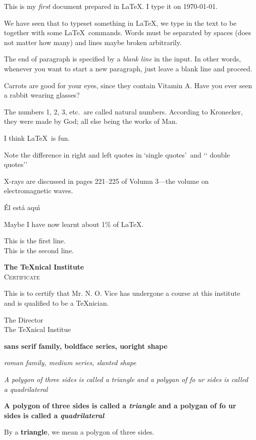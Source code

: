 \documentclass{article}
\begin{document}
This is my \emph{first} document prepared in \LaTeX. I type it on \today.

We have seen that to typeset something in \LaTeX, we type in the text to be
together with some \LaTeX\ commands.
Words must be separated by spaces (does not matter how many)
and lines maybe broken arbitrarily.

\noindent The end of paragraph is specified by a \emph{blank line}
in the input. In other words, whenever you want to start a new
paragraph, just leave a blank line and proceed.

Carrots are good for your eyes, since they contain Vitamin A\@. Have
you ever seen a rabbit wearing glasses?

The numbers 1, 2, 3, etc.\ are called natural numbers. According to
Kronecker, they were made by God; all else being the works of Man.

I think \LaTeX\ is fun.

Note the difference in right and left quotes in \lq single quotes\rq\ and \lq\lq
 double quotes\rq\rq

X-rays are discussed in pages 221--225 of Volumn 3---the volume on electromagnetic
waves.

\'{E}l est\'{a} aqu\'{\i}

Maybe I have now learnt about 1\% of \LaTeX.

\noindent This is the first line.\\[10pt] This is the second line.

\begin{center}
{\bfseries\huge The \TeX nical Institute}\\[1cm]
{\scshape\LARGE Certificate}
\end{center}
\noindent This is to certify that Mr. N. O. Vice has undergone a course at this
institute and is qualified to be a \TeX nician.
\begin{flushright}
{\sffamily The Director\\
The \TeX nical Institue}
\end{flushright}

\textsf{\textbf{sans serif family, boldface series, uoright shape}}

\textrm{\textsl{roman family, medium series, slanted shape}}

\textit{A polygon of three sides is called a \emph{triangle} and a polygan of fo
ur sides is called a \emph{quadrilateral}}

\textbf{A polygon of three sides is called a \emph{triangle} and a polygan of fo
ur sides is called a \emph{quadrilateral}}

By a {\bfseries triangle}, we mean a polygon of three sides.
\end{document}
